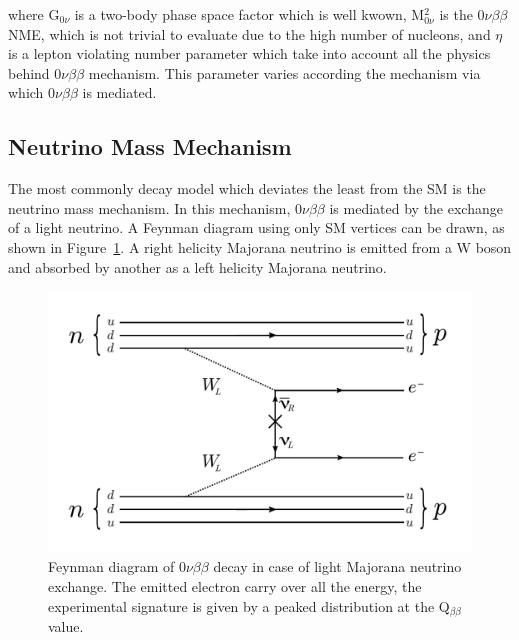 \documentclass[main.tex]{subfiles}
\begin{document}
\bigskip


\NI where G$_{\text{0}\nu}$ is a two-body phase space factor which is well kwown, M$^\text{2}_{\text{0}\nu}$ is the 0$\nu\beta\beta$ NME, which is not trivial to evaluate due to the high number of nucleons, and $\eta$ is a lepton violating number parameter which take into account all the physics behind 0$\nu\beta\beta$ mechanism. This parameter varies according the mechanism via which 0$\nu\beta\beta$ is mediated.  


\FloatBarrier


\subsection{Neutrino Mass Mechanism}\label{sec:NMM}



\NI The most commonly decay model which deviates the least from the SM is the neutrino mass mechanism. In this mechanism, 0$\nu\beta\beta$ is mediated by the exchange of a light neutrino. A Feynman diagram using only SM vertices can be drawn, as shown in Figure~\ref{0nubbNMM}. A right helicity Majorana neutrino is emitted from a W boson and absorbed by another as a left helicity Majorana neutrino. 


\begin{figure}[h!]
\begin{center}
\includegraphics[scale=0.5]{pictures/Chap2/0nubbFeynmanDiagram_NMM.pdf}
\caption{Feynman diagram of 0$\nu\beta\beta$ decay in case of light Majorana neutrino exchange. The emitted electron carry over all the energy, the experimental signature is given by a peaked distribution at the Q$_{\beta\beta}$ value.}
\label{0nubbNMM}
\end{center}
\end{figure}
\end{document}
